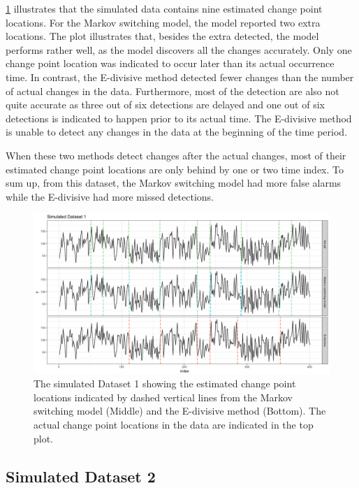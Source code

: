 \ref{compare_sim1} illustrates that the simulated data contains nine
estimated change point locations. For the Markov switching model,
the model reported two extra locations. The plot illustrates that,
besides the extra detected, the model performs rather well, as the
model discovers all the changes accurately. Only one change point
location was indicated to occur later than its actual occurrence time.
In contrast, the E-divisive method detected fewer changes than the
number of actual changes in the data. Furthermore, most of the detection
are also not quite accurate as three out of six detections are delayed
and one out of six detections is indicated to happen prior to its
actual time. The E-divisive method is unable to detect any changes
in the data at the beginning of the time period.

When these two methods detect changes after the actual changes, most
of their estimated change point locations are only behind by one or
two time index. To sum up, from this dataset, the Markov switching
model had more false alarms while the E-divisive had more missed detections. 

\begin{figure}[h]
\begin{centering}
\includegraphics[scale=0.35]{picture/compare_sim1}
\par\end{centering}
\caption{The simulated Dataset 1 showing the estimated change point locations
indicated by dashed vertical lines from the Markov switching model
(Middle) and the E-divisive method (Bottom). The actual change point
locations in the data are indicated in the top plot. }

\label{compare_sim1}
\end{figure}


\subsection{Simulated Dataset 2}

